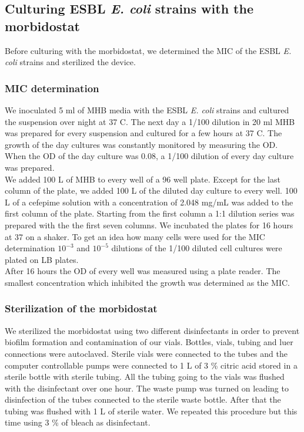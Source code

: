 \subsection{Culturing ESBL \textit{E. coli} strains with the morbidostat}
Before culturing with the morbidostat, we determined the MIC of the ESBL \textit{E. coli} strains and sterilized the device.

\subsubsection{MIC determination}
We inoculated 5 ml of MHB media with the ESBL \textit{E. coli} strains and cultured the suspension over night at 37 \degree C. The next day a 1/100 dilution in 20 ml MHB was prepared for every suspension and cultured for a few hours at 37 \degree C. The growth of the day cultures was constantly monitored by measuring the OD. When the OD of the day culture was 0.08, a 1/100 dilution of every day culture was prepared. \\
We added 100 \textmu L of MHB to every well of a 96 well plate. Except for the last column of the plate, we added 100 \textmu L of the diluted day culture to every well. 100 \textmu L of a cefepime solution with a concentration of 2.048 mg/mL was added to the first column of the plate. Starting from the first column a 1:1 dilution series was prepared with the the first seven columns. We incubated the plates for 16 hours at 37 \degree \space on a shaker. To get an idea how many cells were used for the MIC determination $10^{-3}$ and $10^{-5}$ dilutions of the 1/100 diluted cell cultures were plated on LB plates.\\
After 16 hours the OD of every well was measured using a plate reader. The smallest concentration which inhibited the growth was determined as the MIC. 
\label{section:mic_determination}

\subsubsection{Sterilization of the morbidostat}
We sterilized the morbidostat using two different disinfectants in order to prevent biofilm formation and contamination of our vials.
Bottles, vials, tubing and luer connections were autoclaved. Sterile vials were connected to the tubes and the computer controllable pumps were connected to 1 L of 3 \% citric acid stored in a sterile bottle with sterile tubing. All the tubing going to the vials was flushed with the disinfectant over one hour. The waste pump was turned on leading to disinfection of the tubes connected to the sterile waste bottle. After that the tubing was flushed with 1 L of sterile water. We repeated this procedure but this time using 3 \% of bleach as disinfectant.
\label{section:sterilization}

